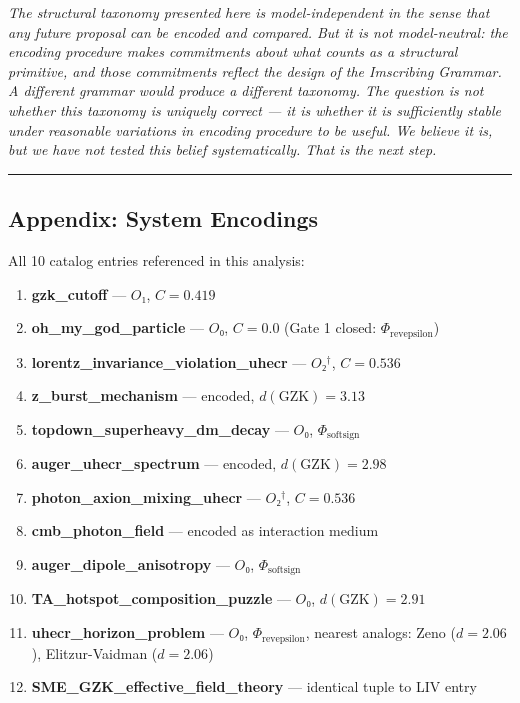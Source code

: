 \documentclass[12pt,a4paper]{article}
\begin{document}
\emph{The structural taxonomy presented here is model-independent in the sense that any future proposal can be encoded and compared. But it is not model-neutral: the encoding procedure makes commitments about what counts as a structural primitive, and those commitments reflect the design of the Imscribing Grammar. A different grammar would produce a different taxonomy. The question is not whether this taxonomy is uniquely correct --- it is whether it is sufficiently stable under reasonable variations in encoding procedure to be useful. We believe it is, but we have not tested this belief systematically. That is the next step.}

\begin{center}
\rule{0.5\textwidth}{0.4pt}
\end{center}

\subsection{Appendix: System Encodings}

All 10 catalog entries referenced in this analysis:

\begin{enumerate}
    \item \textbf{gzk\_cutoff} --- $O₁$, $C = 0.419$
    \item \textbf{oh\_my\_god\_particle} --- $O₀$, $C = 0.0$ (Gate 1 closed: $\Phi_{\text{revepsilon}}$)
    \item \textbf{lorentz\_invariance\_violation\_uhecr} --- $O₂^\dagger$, $C = 0.536$
    \item \textbf{z\_burst\_mechanism} --- encoded, $d(\text{GZK}) = 3.13$
    \item \textbf{topdown\_superheavy\_dm\_decay} --- $O₀$, $\Phi_{\text{softsign}}$
    \item \textbf{auger\_uhecr\_spectrum} --- encoded, $d(\text{GZK}) = 2.98$
    \item \textbf{photon\_axion\_mixing\_uhecr} --- $O₂^\dagger$, $C = 0.536$
    \item \textbf{cmb\_photon\_field} --- encoded as interaction medium
    \item \textbf{auger\_dipole\_anisotropy} --- $O₀$, $\Phi_{\text{softsign}}$
    \item \textbf{TA\_hotspot\_composition\_puzzle} --- $O₀$, $d(\text{GZK}) = 2.91$
    \item \textbf{uhecr\_horizon\_problem} --- $O₀$, $\Phi_{\text{revepsilon}}$, nearest analogs: Zeno ($d=2.06$), Elitzur-Vaidman ($d=2.06$)
    \item \textbf{SME\_GZK\_effective\_field\_theory} --- identical tuple to LIV entry
\end{enumerate}
\end{document}
